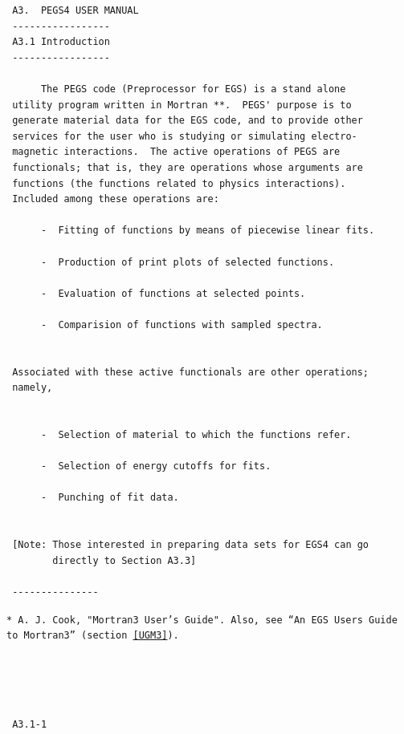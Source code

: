  \newpage {} \begin{verbatim}
 A3.  PEGS4 USER MANUAL 
 -----------------
 A3.1 Introduction
 -----------------
 
      The PEGS code (Preprocessor for EGS) is a stand alone
 utility program written in Mortran **.  PEGS' purpose is to
 generate material data for the EGS code, and to provide other
 services for the user who is studying or simulating electro-
 magnetic interactions.  The active operations of PEGS are
 functionals; that is, they are operations whose arguments are
 functions (the functions related to physics interactions).
 Included among these operations are:
 
      -  Fitting of functions by means of piecewise linear fits.
 
      -  Production of print plots of selected functions.
 
      -  Evaluation of functions at selected points.
 
      -  Comparision of functions with sampled spectra.
 
 
 Associated with these active functionals are other operations;
 namely,
 
 
      -  Selection of material to which the functions refer.
 
      -  Selection of energy cutoffs for fits.
 
      -  Punching of fit data.
 
 
 [Note: Those interested in preparing data sets for EGS4 can go
        directly to Section A3.3]
 
 ---------------
\end{verbatim}
{\tt   ** A. J. Cook, "Mortran3 User's Guide"\cite{Co83}.  Also, see  
``An EGS Users Guide to Mortran3'' (section~\ref{UGM3}).}
\begin{verbatim}




 A3.1-1
\end{verbatim}
\newpage
{}
